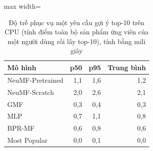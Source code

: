 \begin{table}[htbp]
    \centering\small
    \caption{Độ trễ phục vụ một yêu cầu gợi ý top-10 trên CPU (tính điểm toàn bộ sản phẩm ứng viên của một người dùng rồi lấy top-10), tính bằng mili giây}
    \label{tab:latency}
    \begin{adjustbox}{max width=\textwidth}
    \begin{tabular}{lrrr}
        \toprule
        Mô hình & p50 & p95 & Trung bình \\
        \midrule
        NeuMF-Pretrained & 1{,}1 & 1{,}6 & 1{,}2 \\
        NeuMF-Scratch & 2{,}0 & 2{,}6 & 2{,}1 \\
        GMF & 0{,}3 & 0{,}4 & 0{,}3 \\
        MLP & 0{,}7 & 1{,}1 & 0{,}8 \\
        BPR-MF & 0{,}6 & 0{,}8 & 0{,}6 \\
        Most Popular & 0{,}0 & 0{,}1 & 0{,}0 \\
        \bottomrule
    \end{tabular}
    \end{adjustbox}
    \par{}
\end{table}
